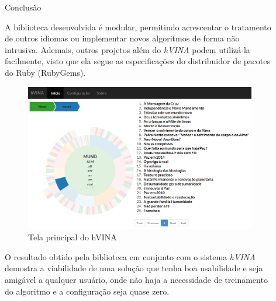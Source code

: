 \documentclass[final]{beamer}
\newlength{\sepwid}
\newlength{\onecolwid}
\newlength{\twocolwid}
\begin{document}
\begin{frame}[t]
\begin{columns}[t]
\begin{column}{\twocolwid}
\begin{columns}[t,totalwidth=\twocolwid]
\end{columns} %

\end{column} %

\begin{column}{\sepwid}\end{column} %

\begin{column}{\onecolwid} %


\begin{block}{Conclusão}

A biblioteca desenvolvida é modular, permitindo acrescentar o tratamento de outros idiomas ou implementar novos algoritmos de forma não intrusiva. Ademais, outros projetos além do \textit{hVINA} podem utilizá-la facilmente, visto que ela segue as especificações do distribuidor de pacotes do Ruby (RubyGems).

\begin{figure}
\includegraphics[width=1\linewidth]{hvina.png}
\caption{Tela principal do hVINA}
\end{figure}

O resultado obtido pela biblioteca em conjunto com o sistema \textit{hVINA} demostra a viabilidade de uma solução que tenha boa usabilidade e seja amigável a qualquer usuário, onde não haja a necessidade de treinamento do algoritmo e a configuração seja quase zero.


\end{block}
\end{column}
\end{columns}
\end{frame}
\end{document}
